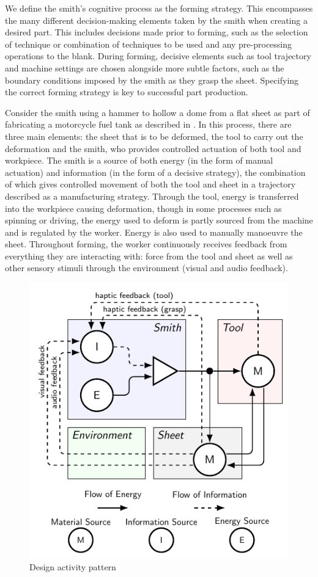 We define the smith’s cognitive process as the forming strategy. This encompasses the many different decision-making elements taken by the smith when creating a desired part. This includes decisions made prior to forming, such as the selection of technique or combination of techniques to be used and any pre-processing operations to the blank. During forming, decisive elements such as tool trajectory and machine settings are chosen alongside more subtle factors, such as the boundary conditions imposed by the smith as they grasp the sheet. Specifying the correct forming strategy is key to successful part production.  

Consider the smith using a hammer to hollow a dome from a flat sheet as part of fabricating a motorcycle fuel tank as described in \citep{Barr2013ProfessionalFabrication}. In this process, there are three main elements: the sheet that is to be deformed, the tool to carry out the deformation and the smith, who provides controlled actuation of both tool and workpiece. The smith is a source of both energy (in the form of manual actuation) and information (in the form of a decisive strategy), the combination of which gives controlled movement of both the tool and sheet in a trajectory described as a manufacturing strategy. Through the tool, energy is transferred into the workpiece causing deformation, though in some processes such as spinning or driving, the energy used to deform is partly sourced from the machine and is regulated by the worker. Energy is also used to manually manoeuvre the sheet. Throughout forming, the worker continuously receives feedback from everything they are interacting with: force from the tool and sheet as well as other sensory stimuli through the environment (visual and audio feedback). 

\begin{figure}[h]
  \centering
  \includegraphics[width=0.5\linewidth]{Diagrams/DAP4.pdf}  
  \caption{Design activity pattern}
  \label{fig:DAP}
\end{figure}

